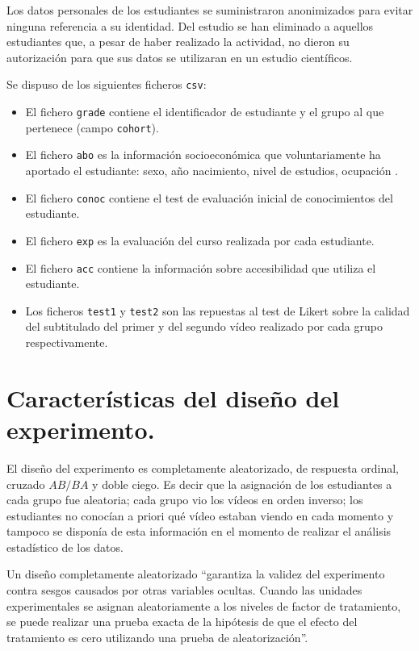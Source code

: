 \documentclass[
  12pt,
  a4paper,
  extrafontsizes,
  onecolumn,
  openright]{memoir}
\providecommand{\tightlist}{%
  \setlength{\itemsep}{0pt}\setlength{\parskip}{0pt}}\usepackage{longtable,booktabs,array}
\begin{document}
Los datos personales de los estudiantes se suministraron anonimizados
para evitar ninguna referencia a su identidad. Del estudio se han
eliminado a aquellos estudiantes que, a pesar de haber realizado la
actividad, no dieron su autorización para que sus datos se utilizaran en
un estudio científicos.

\clearpage

Se dispuso de los siguientes ficheros \texttt{csv}:

\begin{itemize}
\tightlist
\item
  El fichero \texttt{grade} contiene el identificador de estudiante y el
  grupo al que pertenece (campo \texttt{cohort}).
\item
  El fichero \texttt{abo} es la información socioeconómica que
  voluntariamente ha aportado el estudiante: sexo, año nacimiento, nivel
  de estudios, ocupación .
\item
  El fichero \texttt{conoc} contiene el test de evaluación inicial de
  conocimientos del estudiante.
\item
  El fichero \texttt{exp} es la evaluación del curso realizada por cada
  estudiante.
\item
  El fichero \texttt{acc} contiene la información sobre accesibilidad
  que utiliza el estudiante.
\item
  Los ficheros \texttt{test1} y \texttt{test2} son las repuestas al test
  de Likert sobre la calidad del subtitulado del primer y del segundo
  vídeo realizado por cada grupo respectivamente.
\end{itemize}

\hypertarget{sec-diseno}{%
\section{Características del diseño del experimento.}\label{sec-diseno}}

El diseño del experimento es completamente aleatorizado, de respuesta
ordinal, cruzado \(AB/BA\) y doble ciego. Es decir que la asignación de
los estudiantes a cada grupo fue aleatoria; cada grupo vio los vídeos en
orden inverso; los estudiantes no conocían a priori qué vídeo estaban
viendo en cada momento y tampoco se disponía de esta información en el
momento de realizar el análisis estadístico de los datos.

Un diseño completamente aleatorizado \autocite[pp.~18]{lawson2015}
\enquote{garantiza la validez del experimento contra sesgos causados por
otras variables ocultas. Cuando las unidades experimentales se asignan
aleatoriamente a los niveles de factor de tratamiento, se puede realizar
una prueba exacta de la hipótesis de que el efecto del tratamiento es
cero utilizando una prueba de aleatorización}.
\end{document}
